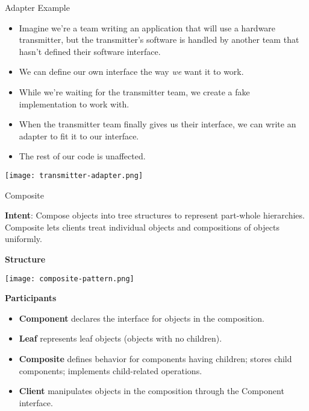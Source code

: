 \documentclass{beamer}
\begin{document}
\begin{frame}[fragile]{Adapter Example}

\begin{itemize}
\item Imagine we're a team writing an application that will use a hardware transmitter, but the transmitter's software is handled by another team that hasn't defined their software interface.
\item We can define our own interface the way {\it we} want it to work.
\item While we're waiting for the transmitter team, we create a fake implementation to work with.
\item When the transmitter team finally gives us their interface, we can write an adapter to fit it to our interface.
\item The rest of our code is unaffected.
\end{itemize}

\begin{center}
\texttt{[image: transmitter-adapter.png]}
\end{center}


\end{frame}

\begin{frame}[fragile]{Composite}


{\bf Intent}: Compose objects into tree structures to represent part-whole hierarchies. Composite lets clients treat individual objects and compositions of objects uniformly.

{\bf Structure}
\vspace{-.1in}
\begin{center}
\texttt{[image: composite-pattern.png]}\\
\end{center}
\vspace{-.125in}
{\bf Participants}
\begin{itemize}
\item {\bf Component} declares the interface for objects in the composition.
\item {\bf Leaf} represents leaf objects (objects with no children).
\item {\bf Composite} defines behavior for components having children; stores child components; implements child-related operations.
\item {\bf Client} manipulates objects in the composition through the Component interface.
\end{itemize}


\end{frame}
\end{document}
